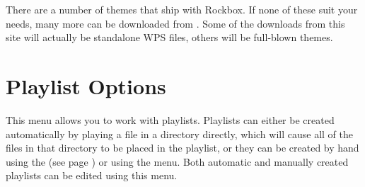 There are a number of themes that ship with Rockbox. If none of
these suit your needs, many more can be downloaded from 
%
%
%
%
%
%
%
.
Some of the downloads from this site will actually be standalone WPS files, 
others will be full-blown themes. 




\section{\label{ref:playlistoptions}Playlist Options}
  This menu allows you to work with playlists. Playlists can either be created
automatically by playing a file in a directory directly, which will cause all 
of the files in that directory to be placed in the playlist, or they can be
created by hand using the  (see page \pageref{ref:Filemenu}) 
or using the  menu.  Both  automatic and manually 
created playlists can be edited using this menu.

